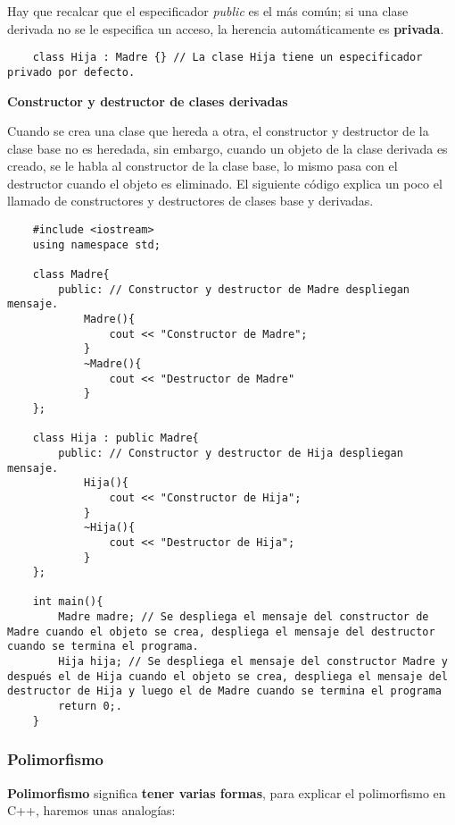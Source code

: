 Hay que recalcar que el especificador \textit{public} es el más común; si una clase derivada no se le especifica un acceso, la herencia automáticamente es \textbf{privada}.
\begin{lstlisting}
    class Hija : Madre {} // La clase Hija tiene un especificador privado por defecto.
\end{lstlisting}

\textbf{Constructor y destructor de clases derivadas}

Cuando se crea una clase que hereda a otra, el constructor y destructor de la clase base no es heredada, sin embargo, cuando un objeto de la clase derivada es creado, se le habla al constructor de la clase base, lo mismo pasa con el destructor cuando el objeto es eliminado. El siguiente código explica un poco el llamado de constructores y destructores de clases base y derivadas.
\begin{lstlisting}
    #include <iostream>
    using namespace std;
    
    class Madre{
        public: // Constructor y destructor de Madre despliegan mensaje.
            Madre(){
                cout << "Constructor de Madre";
            }
            ~Madre(){
                cout << "Destructor de Madre"
            }
    };
    
    class Hija : public Madre{
        public: // Constructor y destructor de Hija despliegan mensaje.
            Hija(){
                cout << "Constructor de Hija";
            }
            ~Hija(){
                cout << "Destructor de Hija";
            }
    };
    
    int main(){
        Madre madre; // Se despliega el mensaje del constructor de Madre cuando el objeto se crea, despliega el mensaje del destructor cuando se termina el programa.
        Hija hija; // Se despliega el mensaje del constructor Madre y después el de Hija cuando el objeto se crea, despliega el mensaje del destructor de Hija y luego el de Madre cuando se termina el programa
        return 0;.
    }
\end{lstlisting}


\subsubsection{Polimorfismo}

\textbf{Polimorfismo} significa \textbf{tener varias formas}, para explicar el polimorfismo en C++, haremos unas analogías:

